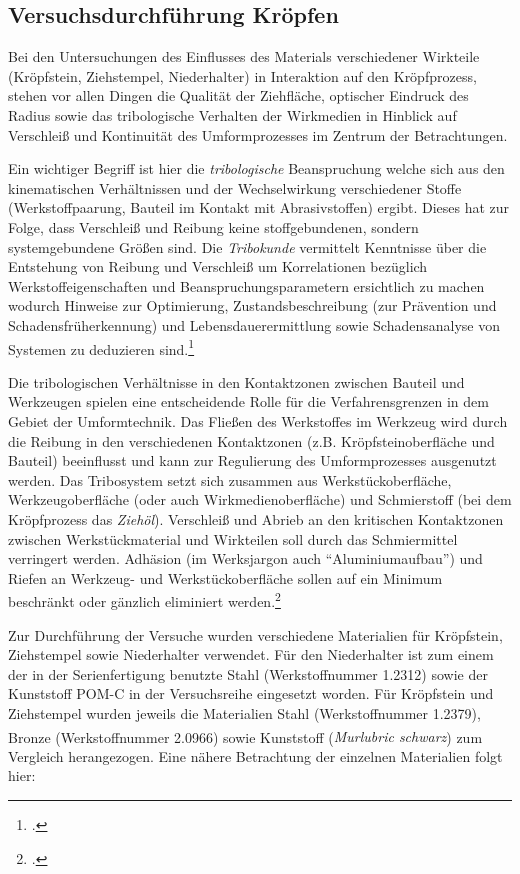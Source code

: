\documentclass[12pt,a4paper,parskip]{scrartcl}
\begin{document}
\newpage
\subsection{Versuchsdurchführung Kröpfen}
Bei den Untersuchungen des Einflusses des Materials verschiedener Wirkteile (Kröpfstein, Ziehstempel, Niederhalter) in Interaktion  auf den Kröpfprozess, stehen vor allen Dingen die Qualität der Ziehfläche, optischer Eindruck des Radius  sowie das tribologische Verhalten der Wirkmedien in Hinblick auf Verschleiß und Kontinuität des Umformprozesses im Zentrum der Betrachtungen.

Ein wichtiger Begriff ist hier die \emph{tribologische} Beanspruchung welche sich aus den kinematischen Verhältnissen und der Wechselwirkung verschiedener Stoffe (Werkstoffpaarung, Bauteil im Kontakt mit Abrasivstoffen) ergibt. Dieses hat zur Folge, dass Verschleiß und Reibung keine stoffgebundenen, sondern systemgebundene Größen sind. Die \emph{Tribokunde} vermittelt Kenntnisse über die Entstehung von Reibung und Verschleiß um Korrelationen bezüglich Werkstoffeigenschaften und Beanspruchungsparametern ersichtlich zu machen wodurch Hinweise zur Optimierung, Zustandsbeschreibung (zur Prävention und Schadensfrüherkennung) und Lebensdauerermittlung sowie Schadensanalyse von Systemen zu deduzieren sind.\footcite[Vgl.][388-390]{wki}

Die tribologischen Verhältnisse in den Kontaktzonen zwischen Bauteil und Werkzeugen spielen eine entscheidende Rolle für die Verfahrensgrenzen in dem Gebiet der Umformtechnik. Das Fließen des Werkstoffes im Werkzeug wird durch die Reibung in den verschiedenen Kontaktzonen (z.B. Kröpfsteinoberfläche und Bauteil) beeinflusst und kann zur Regulierung des Umformprozesses ausgenutzt werden. Das Tribosystem setzt sich zusammen aus Werkstückoberfläche, Werkzeugoberfläche (oder auch Wirkmedienoberfläche) und Schmierstoff (bei dem Kröpfprozess das \emph{Ziehöl}). Verschleiß und Abrieb  an den kritischen Kontaktzonen zwischen Werkstückmaterial und Wirkteilen soll durch das Schmiermittel verringert werden. Adhäsion (im Werksjargon auch "`Aluminiumaufbau"') und Riefen  an Werkzeug- und Werkstückoberfläche sollen auf ein Minimum beschränkt oder gänzlich eliminiert werden.\footcite[Vgl.][516]{aa}

\newpage


Zur Durchführung der Versuche wurden verschiedene Materialien für Kröpfstein, Ziehstempel sowie Niederhalter verwendet. Für den Niederhalter ist zum einem der in der Serienfertigung benutzte Stahl (Werkstoffnummer 1.2312) sowie der Kunststoff POM-C in der Versuchsreihe eingesetzt worden. Für Kröpfstein und Ziehstempel wurden jeweils die Materialien Stahl (Werkstoffnummer 1.2379), Bronze (Werkstoffnummer 2.0966) sowie Kunststoff (\emph{Murlubric\textsuperscript{\textregistered} schwarz}) zum Vergleich herangezogen. Eine nähere Betrachtung der einzelnen Materialien folgt hier:
\end{document}
